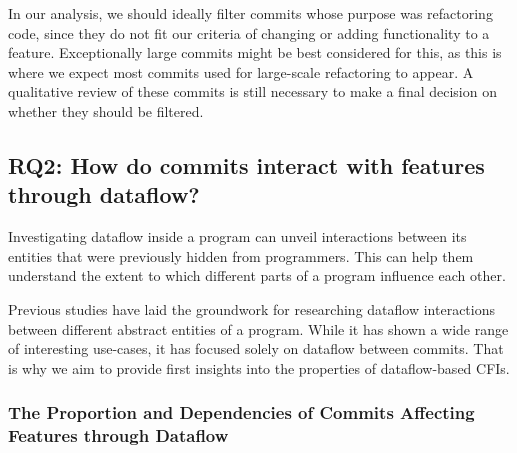 In our analysis, we should ideally filter commits whose purpose was refactoring code, since they do not fit our criteria of changing or adding functionality to a feature.
Exceptionally large commits might be best considered for this, as this is where we expect most commits used for large-scale refactoring to appear.
A qualitative review of these commits is still necessary to make a final decision on whether they should be filtered.

\subsection{\textbf{RQ2}: How do commits interact with features through dataflow?}\label{sec:meth:RQ2}

Investigating dataflow inside a program can unveil interactions between its entities that were previously hidden from programmers.
This can help them understand the extent to which different parts of a program influence each other.

Previous studies have laid the groundwork for researching dataflow interactions between different abstract entities of a program.
While it has shown a wide range of interesting use-cases, it has focused solely on dataflow between commits.
That is why we aim to provide first insights into the properties of dataflow-based CFIs.

\subsubsection*{The Proportion and Dependencies of Commits Affecting Features through Dataflow}

